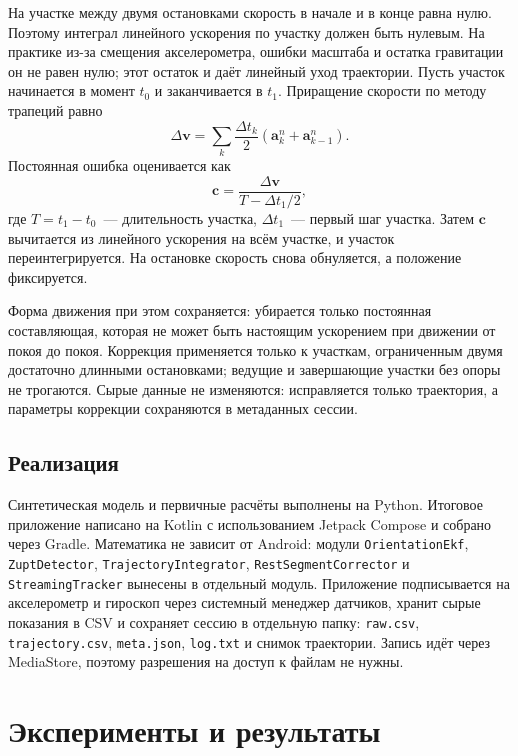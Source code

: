 \documentclass{misisarticle}
\begin{document}
На участке между двумя остановками скорость в начале и в конце равна нулю. Поэтому интеграл линейного ускорения по участку должен быть нулевым. На практике из-за смещения акселерометра, ошибки масштаба и остатка гравитации он не равен нулю; этот остаток и даёт линейный уход траектории. Пусть участок начинается в момент $t_0$ и заканчивается в $t_1$. Приращение скорости по методу трапеций равно
\begin{equation}
\Delta\mathbf v=\sum_{k}\frac{\Delta t_k}{2}\left(\mathbf a_k^{n}+\mathbf a_{k-1}^{n}\right).
\label{eq:dv}
\end{equation}
Постоянная ошибка оценивается как
\begin{equation}
\mathbf c=\frac{\Delta\mathbf v}{T-\Delta t_1/2},
\label{eq:corr}
\end{equation}
где $T=t_1-t_0$~--- длительность участка, $\Delta t_1$~--- первый шаг участка. Затем $\mathbf c$ вычитается из линейного ускорения на всём участке, и участок переинтегрируется. На остановке скорость снова обнуляется, а положение фиксируется.

Форма движения при этом сохраняется: убирается только постоянная составляющая, которая не может быть настоящим ускорением при движении от покоя до покоя. Коррекция применяется только к участкам, ограниченным двумя достаточно длинными остановками; ведущие и завершающие участки без опоры не трогаются. Сырые данные не изменяются: исправляется только траектория, а параметры коррекции сохраняются в метаданных сессии.

\subsection{Реализация}

Синтетическая модель и первичные расчёты выполнены на Python. Итоговое приложение написано на Kotlin с использованием Jetpack Compose и собрано через Gradle. Математика не зависит от Android: модули \texttt{OrientationEkf}, \texttt{ZuptDetector}, \texttt{TrajectoryIntegrator}, \texttt{RestSegmentCorrector} и \texttt{StreamingTracker} вынесены в отдельный модуль. Приложение подписывается на акселерометр и гироскоп через системный менеджер датчиков, хранит сырые показания в CSV и сохраняет сессию в отдельную папку: \texttt{raw.csv}, \texttt{trajectory.csv}, \texttt{meta.json}, \texttt{log.txt} и снимок траектории. Запись идёт через MediaStore, поэтому разрешения на доступ к файлам не нужны.

\section{Эксперименты и результаты}
\end{document}
